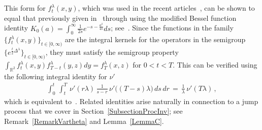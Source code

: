 \documentclass[10pt]{article}
\numberwithin{equation}{section}
\theoremstyle{definition}
\newcommand{\R}{{\mathbb R}}
\begin{document}
This form for $f^{\lambda}_t(x,y)$, which was used in the recent articles~\cite{GQT,Chen,CSZ5},  can  be shown to   equal that  previously given  in~\cite[Eqn.\ (3.11)]{Albeverio} through using the modified Bessel function identity $K_0(a)=\int_0^{\infty} \frac{1}{2s}e^{-s-\frac{a^2}{4s}  }ds    $; see~\cite[Rrk.\ 2.1]{GQT}.  Since the  functions in the family $\{ f_t^{\lambda}(x,y) \}_{t\in [0,\infty)}$ are the integral kernels  for the operators in the semigroup $\{e^{\frac{t}{2}\Delta^{\lambda}}\}_{t\in [0,\infty)}$, they must satisfy the semigroup property $\int_{\R^2}f_t^{\lambda}(x,y)f_{T-t}^{\lambda}(y,z)dy=f_{T}^{\lambda}(x,z) $ for $0<t<T$. This can be verified  using the following integral identity for $\nu'$
\begin{align}\label{DoubleNuPrime}
\int_{0}^t \,\int_{t}^T  \,\nu'(r\lambda)\,\frac{1}{s-r}\,\nu'\big( (T-s)\lambda\big) \,ds\,dr\,=\,\frac{1}{\lambda} \,\nu'(T\lambda)\,, 
\end{align}
which is equivalent to~\cite[Lem.\ 8.7]{GQT}.  Related identities arise naturally in connection to a jump process that we cover in Section~\ref{SubsectionProcInv}; see Remark~\ref{RemarkVartheta} and Lemma~\ref{LemmaC}.
\end{document}
